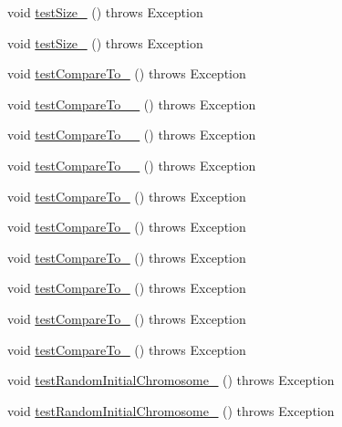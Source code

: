 \begin{DoxyCompactItemize}
void \hyperlink{classorg_1_1jgap_1_1_chromosome_test_a86944398d2aeeddc0428dc7dc2555847}{test\-Size\-\_} ()  throws Exception 
\item 
void \hyperlink{classorg_1_1jgap_1_1_chromosome_test_a50d5f28dcaba52ef319351cddd6b3c3c}{test\-Size\-\_} ()  throws Exception 
\item 
void \hyperlink{classorg_1_1jgap_1_1_chromosome_test_a2fb2a2d705cc1e7d7a6f06813fb54496}{test\-Compare\-To\-\_} ()  throws Exception 
\item 
void \hyperlink{classorg_1_1jgap_1_1_chromosome_test_aa1e8dec9018882ee106415ce4d94520c}{test\-Compare\-To\-\_\-\_} ()  throws Exception 
\item 
void \hyperlink{classorg_1_1jgap_1_1_chromosome_test_a64fed24326dd8ebd8a884ad1dbd10d16}{test\-Compare\-To\-\_\-\_} ()  throws Exception 
\item 
void \hyperlink{classorg_1_1jgap_1_1_chromosome_test_ad2abea02551eff092551445718940fef}{test\-Compare\-To\-\_\-\_} ()  throws Exception 
\item 
void \hyperlink{classorg_1_1jgap_1_1_chromosome_test_aa22713b950dfcaefd5425a31588d1844}{test\-Compare\-To\-\_} ()  throws Exception 
\item 
void \hyperlink{classorg_1_1jgap_1_1_chromosome_test_a8285fca5ffecd0c73859898eccd327a7}{test\-Compare\-To\-\_} ()  throws Exception 
\item 
void \hyperlink{classorg_1_1jgap_1_1_chromosome_test_ae03b562582a0fa6ebc4fde8e012d3598}{test\-Compare\-To\-\_} ()  throws Exception 
\item 
void \hyperlink{classorg_1_1jgap_1_1_chromosome_test_a8d96875942f57764a14925106b791950}{test\-Compare\-To\-\_} ()  throws Exception 
\item 
void \hyperlink{classorg_1_1jgap_1_1_chromosome_test_a331ef1e675e6ddc534d86606935fae77}{test\-Compare\-To\-\_} ()  throws Exception 
\item 
void \hyperlink{classorg_1_1jgap_1_1_chromosome_test_a8db6974675e8033b23fb9ea0f0f2f541}{test\-Compare\-To\-\_} ()  throws Exception 
\item 
void \hyperlink{classorg_1_1jgap_1_1_chromosome_test_a2bca78edfac9189865be292a63e04850}{test\-Random\-Initial\-Chromosome\-\_} ()  throws Exception 
\item 
void \hyperlink{classorg_1_1jgap_1_1_chromosome_test_a76fc778f31213b76425a3be7c7263c9b}{test\-Random\-Initial\-Chromosome\-\_} ()  throws Exception 
\item 

\end{DoxyCompactItemize}
